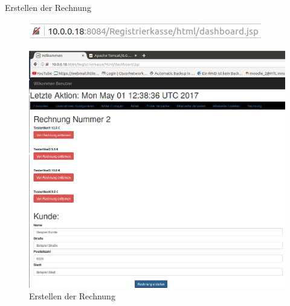 \documentclass[12pt]{beamer}
\begin{document}
\begin{frame}
Erstellen der Rechnung
\begin{figure}
	\includegraphics[scale=0.5]{Bilder/URL1.png}
\end{figure}
\begin{figure}
	\includegraphics[scale=0.17]{Bilder/rechnungErstellen.png}
	\caption{Erstellen der Rechnung}
\end{figure}

\end{frame}
\end{document}

